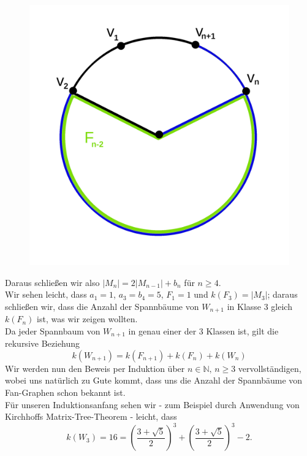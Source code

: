 \begin{figure}[H]
\begin{minipage}{0.45\textwidth}
        \includegraphics[width=1\textwidth]{mn3.png}
        \caption{}
 \label{mn3} %
    \end{minipage}
\end{figure}
Daraus schließen wir also $|M_{n}|=2|M_{n-1}|+b_{n}$ für $n\geq4$.\\
Wir sehen leicht, dass $a_1=1$, $a_3=b_4=5$, $F_1=1$ und $\mathit{k}\left(F_3\right)=|M_3|$; daraus schließen wir, dass die Anzahl der Spannbäume von $W_{n+1}$ in Klasse 3 gleich $\mathit{k}\left(F_{n}\right)$ ist, was wir zeigen wollten.\\
Da jeder Spannbaum von $W_{n+1}$ in genau einer der 3 Klassen ist, gilt die rekursive Beziehung
\begin{equation}
\mathit{k}\left(W_{n+1}\right) = \mathit{k}\left(F_{n+1}\right) + \mathit{k}\left(F_n\right) + \mathit{k}\left(W_n\right)
\label{eq:wrek}
\end{equation}
Wir werden nun den Beweis per Induktion über $n \in \mathbb{N}, \, n \geq 3$ vervollständigen, wobei uns natürlich zu Gute kommt, dass uns die Anzahl der Spannbäume von Fan-Graphen schon bekannt ist.\\
Für unseren Induktionsanfang sehen wir - zum Beispiel durch Anwendung von Kirchhoffs Matrix-Tree-Theorem - leicht, dass \begin{equation}
\mathit{k}\left(W_3\right) = 16 = \left(\frac{3+\sqrt{5}}{2}\right)^3+\left(\frac{3+\sqrt{5}}{2}\right)^3-2.
\end{equation}
